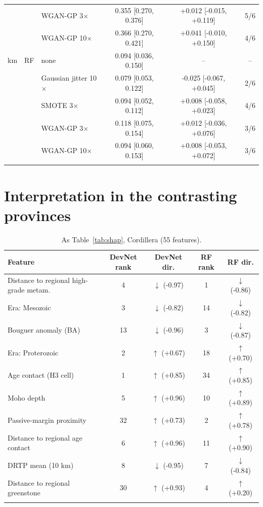 \documentclass[pdflatex,sn-apa]{sn-jnl}
\begin{document}
\begin{appendices}
\begin{table}[!h]
\begin{tabular*}{\textwidth}{@{\extracolsep\fill}lllccc}
 &  & WGAN-GP 3$\times$ & 0.355 [0.270, 0.376] & +0.012 [-0.015, +0.119] & 5/6 \\
 &  & WGAN-GP 10$\times$ & 0.366 [0.270, 0.421] & +0.041 [-0.010, +0.150] & 4/6 \\
\addlinespace
200 km & RF & none & 0.094 [0.036, 0.150] & -- & -- \\
 &  & Gaussian jitter 10$\times$ & 0.079 [0.053, 0.122] & -0.025 [-0.067, +0.045] & 2/6 \\
 &  & SMOTE 3$\times$ & 0.094 [0.052, 0.112] & +0.008 [-0.058, +0.023] & 4/6 \\
 &  & WGAN-GP 3$\times$ & 0.118 [0.075, 0.154] & +0.012 [-0.036, +0.076] & 3/6 \\
 &  & WGAN-GP 10$\times$ & 0.094 [0.060, 0.153] & +0.008 [-0.053, +0.072] & 3/6 \\
\botrule
\end{tabular*}
\end{table}

\clearpage
\section{Interpretation in the contrasting provinces}\label{app:shap}

\begin{table}[!h]
\caption{As Table~\ref{tab:shap}, Cordillera (55 features).}\label{tab:shap-cord}
\footnotesize
\begin{tabular*}{\textwidth}{@{\extracolsep\fill}lcccc}
\toprule
Feature & DevNet rank & DevNet dir. & RF rank & RF dir. \\
\midrule
Distance to regional high-grade metam. & 4 & $\downarrow$ (-0.97) & 1 & $\downarrow$ (-0.86) \\
Era: Mesozoic & 3 & $\downarrow$ (-0.82) & 14 & $\downarrow$ (-0.82) \\
Bouguer anomaly (BA) & 13 & $\downarrow$ (-0.96) & 3 & $\downarrow$ (-0.87) \\
Era: Proterozoic & 2 & $\uparrow$ (+0.67) & 18 & $\uparrow$ (+0.70) \\
Age contact (H3 cell) & 1 & $\uparrow$ (+0.85) & 34 & $\uparrow$ (+0.85) \\
Moho depth & 5 & $\uparrow$ (+0.96) & 10 & $\uparrow$ (+0.89) \\
Passive-margin proximity & 32 & $\uparrow$ (+0.73) & 2 & $\uparrow$ (+0.78) \\
Distance to regional age contact & 6 & $\uparrow$ (+0.96) & 11 & $\uparrow$ (+0.90) \\
DRTP mean (10 km) & 8 & $\downarrow$ (-0.95) & 7 & $\downarrow$ (-0.84) \\
Distance to regional greenstone & 30 & $\uparrow$ (+0.93) & 4 & $\uparrow$ (+0.20) \\
\botrule
\end{tabular*}
\end{table}


\end{appendices}
\end{document}
